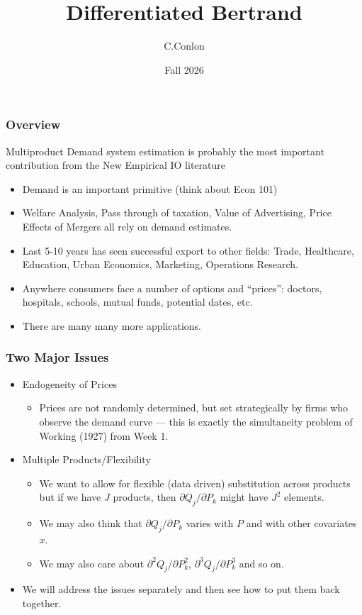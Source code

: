 \documentclass[aspectratio=169,11pt]{beamer}
\title{Differentiated Bertrand}
\author{C.Conlon}
\institute{Grad IO }
\date{Fall 2026}
\begin{document}
\frame{\titlepage}

\begin{frame}
\frametitle{Overview}
Multiproduct Demand system estimation is probably the most important contribution from the New Empirical IO literature
\begin{itemize}
\item Demand is an important primitive (think about Econ 101)
\item Welfare Analysis, Pass through of taxation, Value of Advertising, Price Effects of Mergers all rely on demand estimates.
\item Last 5-10 years has seen successful export to other fields: Trade, Healthcare, Education, Urban Economics, Marketing, Operations Research.
\item Anywhere consumers face a number of options and ``prices'': doctors, hospitals, schools, mutual funds, potential dates, etc.
\item There are many many more applications.
\end{itemize}
\end{frame}

\begin{frame}
\frametitle{Two Major Issues}
\begin{itemize}
\item Endogeneity of Prices
\begin{itemize}
\item Prices are not randomly determined, but set strategically by firms who observe the demand curve --- this is exactly the \alert{simultaneity} problem of Working (1927) from Week 1.
\end{itemize}
\item Multiple Products/Flexibility
\begin{itemize}
\item We want to allow for flexible (data driven) substitution across products but if we have $J$ products, then $\partial Q_j / \partial P_k$ might have $J^2$ elements.
\item We may also think that $\partial Q_j / \partial P_k$ varies with $P$ and with other covariates $x$.
\item We may also care about $\partial^2 Q_j / \partial P_k^2$, $\partial^3 Q_j / \partial P_k^3$ and so on.
\end{itemize}
\item We will address the issues separately and then see how to put them back together.
\end{itemize}
\end{frame}
\end{document}
